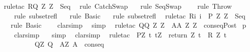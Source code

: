 \begin{isabellebody}
\isamarkupfalse%
\ {\isacharparenleft}rule{\isacharunderscore}tac\ R{\isacharequal}{\isachardoublequoteopen}Q{\isacharprime}\ Z\ Z{\isacharprime}{\isachardoublequoteclose}\ \ Seq{\isacharparenright}\isanewline
{}\isamarkupfalse%
\ \ {\isacharparenleft}rule\ CatchSwap{\isacharparenright}\isanewline
{}\isamarkupfalse%
\ \ \ {\isacharparenleft}rule\ SeqSwap{\isacharparenright}\isanewline
{}\isamarkupfalse%
\ \ \ \ {\isacharparenleft}rule\ Throw{\isacharparenright}\ \isanewline
{}\isamarkupfalse%
\ \ \ \ {\isacharparenleft}rule\ subset{\isacharunderscore}refl{\isacharparenright}\isanewline
{}\isamarkupfalse%
\ \ \ {\isacharparenleft}rule\ Basic{\isacharparenright}\isanewline
{}\isamarkupfalse%
\ \ \ {\isacharparenleft}rule\ subset{\isacharunderscore}refl{\isacharparenright}\isanewline
{}\isamarkupfalse%
\ \ {\isacharparenleft}rule{\isacharunderscore}tac\ R{\isacharequal}{\isachardoublequoteopen}{\isacharbraceleft}i{\isachardot}\ i\ {\isasymin}\ P{\isacharprime}\ Z\ Z{\isacharprime}{\isacharbraceright}{\isachardoublequoteclose}\ \ Seq{\isacharparenright}\isanewline
{}\isamarkupfalse%
\ \ \ {\isacharparenleft}rule\ Basic{\isacharparenright}\ \isanewline
{}\isamarkupfalse%
\ \ \ clarsimp\isanewline
{}\isamarkupfalse%
\ \ simp\isanewline
{}\isamarkupfalse%
\ \ {\isacharparenleft}rule{\isacharunderscore}tac\ Q{\isacharprime}{\isacharequal}{\isachardoublequoteopen}Q{\isacharprime}\ Z\ Z{\isacharprime}{\isachardoublequoteclose}\ \ A{\isacharprime}{\isacharequal}{\isachardoublequoteopen}A{\isacharprime}\ Z\ Z{\isacharprime}{\isachardoublequoteclose}\ \ conseqPost{\isacharparenright}\isanewline
{}\isamarkupfalse%
\ p\isanewline
{}\isamarkupfalse%
\ \ \ \ clarsimp\isanewline
{}\isamarkupfalse%
\ \ \ simp\isanewline
{}\isamarkupfalse%
\ \ clarsimp\isanewline
{}\isamarkupfalse%
\ \ {\isacharparenleft}rule{\isacharunderscore}tac\ \ P{\isacharprime}{\isacharequal}{\isachardoublequoteopen}{\isasymlambda}Z{\isacharprime}{\isacharprime}{\isachardot}\ {\isacharbraceleft}t{\isachardot}\ t{\isacharequal}Z{\isacharprime}{\isacharprime}\ {\isasymand}\ return\ Z\ t\ {\isasymin}\ R\ Z\ t{\isacharbraceright}{\isachardoublequoteclose}\ \ \isanewline
\ \ \ \ \ \ \ \ \ \ Q{\isacharprime}{\isacharequal}{\isachardoublequoteopen}{\isasymlambda}Z{\isacharprime}{\isacharprime}{\isachardot}\ Q{\isachardoublequoteclose}\ \ A{\isacharprime}{\isacharequal}{\isachardoublequoteopen}{\isasymlambda}Z{\isacharprime}{\isacharprime}{\isachardot}\ A{\isachardoublequoteclose}\ \ conseq{\isacharparenright}\isanewline

\end{isabellebody}
